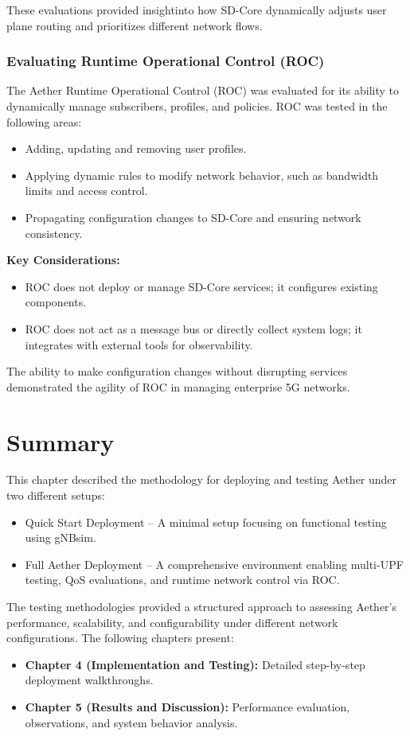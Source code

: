 These evaluations provided insightinto how SD-Core dynamically adjusts user plane routing and prioritizes different network flows.

\subsubsection{Evaluating Runtime Operational Control (ROC)}

The Aether Runtime Operational Control (ROC) was evaluated for its ability to dynamically manage subscribers, profiles, and policies. ROC was tested in the following areas:

\begin{itemize}
    \item Adding, updating and removing user profiles.
    \item Applying dynamic rules to modify network behavior, such as bandwidth limits and access control.
    \item Propagating configuration changes to SD-Core and ensuring network consistency.
\end{itemize}

\textbf{Key Considerations:}  
\begin{itemize}
    \item ROC does not deploy or manage SD-Core services; it configures existing components.
    \item ROC does not act as a message bus or directly collect system logs; it integrates with external tools for observability.
\end{itemize}

The ability to make configuration changes without disrupting services demonstrated the agility of ROC in managing enterprise 5G networks.

\section{Summary}

This chapter described the methodology for deploying and testing Aether under two different setups:
\begin{itemize}
    \item Quick Start Deployment – A minimal setup focusing on functional testing using gNBsim.
    \item Full Aether Deployment – A comprehensive environment enabling multi-UPF testing, QoS evaluations, and runtime network control via ROC.
\end{itemize}

The testing methodologies provided a structured approach to assessing Aether's performance, scalability, and configurability under different network configurations. The following chapters present:
\begin{itemize}
    \item \textbf{Chapter 4 (Implementation and Testing):} Detailed step-by-step deployment walkthroughs.
    \item \textbf{Chapter 5 (Results and Discussion):} Performance evaluation, observations, and system behavior analysis.
\end{itemize}

